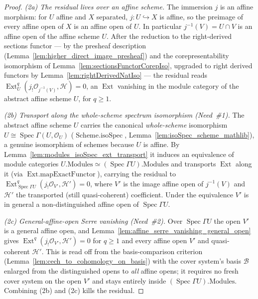 \begin{proof}
  \emph{(2a) The residual lives over an affine scheme.} The immersion \(j\) is an affine morphism:
  for \(U\) affine and \(X\) separated,
  \(j : U \hookrightarrow X\) is affine, so the preimage of every affine open of \(X\) is an affine
  open of \(U\). In particular \(j^{-1}(V) = U \cap V\) is an
  affine open of the affine scheme \(U\). After the reduction to the right-derived sections functor
  --- by the presheaf description (Lemma~\ref{lem:higher_direct_image_presheaf}) and the
  corepresentability isomorphism of Lemma~\ref{lem:sectionsFunctorCorepIso}, upgraded to right derived
  functors by Lemma~\ref{lem:rightDerivedNatIso} --- the residual reads
  \(\operatorname{Ext}^q_{U}(j_!\mathcal{O}_{j^{-1}(V)}, \mathcal{H}) = 0\), an \(\operatorname{Ext}\)
  vanishing in the module category of the abstract affine scheme \(U\), for \(q \geq 1\).

  \emph{(2b) Transport along the whole-scheme spectrum isomorphism (Need~\#1).} The abstract affine
  scheme \(U\) carries the canonical \emph{whole-scheme} isomorphism
  \(U \cong \operatorname{Spec}\Gamma(U, \mathcal{O}_U)\) (\(\operatorname{Scheme.isoSpec}\),
  Lemma~\ref{lem:isoSpec_scheme_mathlib}), a genuine isomorphism of schemes because \(U\) is affine.
  By Lemma~\ref{lem:modules_isoSpec_ext_transport} it induces an equivalence of module categories
  \(U.\mathrm{Modules} \simeq (\operatorname{Spec}\Gamma U).\mathrm{Modules}\) and transports
  \(\operatorname{Ext}\) along it (via \(\operatorname{Ext.mapExactFunctor}\)), carrying the residual to
  \(\operatorname{Ext}^q_{\operatorname{Spec}\Gamma U}(j_!\mathcal{O}_{V'}, \mathcal{H}') = 0\), where
  \(V'\) is the image affine open of \(j^{-1}(V)\) and \(\mathcal{H}'\) the transported (still
  quasi-coherent) coefficient. Under the equivalence \(V'\) is in general a non-distinguished affine
  open of \(\operatorname{Spec}\Gamma U\).

  \emph{(2c) General-affine-open Serre vanishing (Need~\#2).} Over \(\operatorname{Spec}\Gamma U\) the
  open \(V'\) is a general affine open, and Lemma~\ref{lem:affine_serre_vanishing_general_open} gives
  \(\operatorname{Ext}^q(j_!\mathcal{O}_{V'}, \mathcal{H}') = 0\) for \(q \geq 1\) and every affine
  open \(V'\) and quasi-coherent \(\mathcal{H}'\). This is read off from the basis-comparison criterion
  (Lemma~\ref{lem:cech_to_cohomology_on_basis}) with the cover system's basis \(\mathcal{B}\) enlarged
  from the distinguished opens to \emph{all} affine opens; it requires no fresh cover system on the
  open \(V'\) and stays entirely inside \((\operatorname{Spec}\Gamma U).\mathrm{Modules}\). Combining
  (2b) and (2c) kills the residual.


\end{proof}

